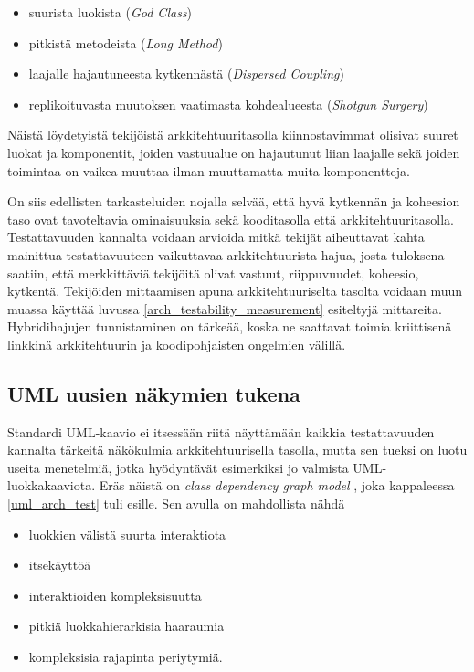 \documentclass[finnish]{tktltiki2}
\numberwithin{table}{section}
\theoremstyle{definition}
\theoremstyle{remark}
\begin{document}
\begin{itemize}
	\item suurista luokista (\textit{God Class})
	\item pitkistä metodeista (\textit{Long Method})
	\item laajalle hajautuneesta kytkennästä (\textit{Dispersed Coupling})
	\item replikoituvasta muutoksen vaatimasta kohdealueesta (\textit{Shotgun Surgery})
\end{itemize}

\noindent
Näistä löydetyistä tekijöistä arkkitehtuuritasolla kiinnostavimmat olisivat suuret luokat ja komponentit, joiden vastuualue on hajautunut liian laajalle sekä joiden toimintaa on vaikea muuttaa ilman muuttamatta muita komponentteja.

On siis edellisten tarkasteluiden nojalla selvää, että hyvä kytkennän ja koheesion taso ovat tavoteltavia ominaisuuksia sekä kooditasolla että arkkitehtuuritasolla. Testattavuuden kannalta voidaan arvioida mitkä tekijät aiheuttavat kahta mainittua testattavuuteen vaikuttavaa arkkitehtuurista hajua, josta tuloksena saatiin, että merkkittäviä tekijöitä olivat vastuut, riippuvuudet, koheesio, kytkentä. Tekijöiden mittaamisen apuna arkkitehtuuriselta tasolta voidaan muun muassa käyttää luvussa \ref{arch_testability_measurement} esiteltyjä mittareita. Hybridihajujen tunnistaminen on tärkeää, koska ne saattavat toimia kriittisenä linkkinä arkkitehtuurin ja koodipohjaisten ongelmien välillä. 


\subsection{UML uusien näkymien tukena}


Standardi UML-kaavio ei itsessään riitä näyttämään kaikkia testattavuuden kannalta tärkeitä näkökulmia arkkitehtuurisella tasolla, mutta sen tueksi on luotu useita menetelmiä, jotka hyödyntävät esimerkiksi jo valmista UML-luokkakaaviota. Eräs näistä on \textit{class dependency graph model} \citep{baudry_testability_2002}, joka kappaleessa \ref{uml_arch_test} tuli esille. Sen avulla on mahdollista nähdä 

\begin{itemize}
	\item luokkien välistä suurta interaktiota
	\item itsekäyttöä
	\item interaktioiden kompleksisuutta
	\item pitkiä luokkahierarkisia haaraumia
	\item kompleksisia rajapinta periytymiä.
\end{itemize}
\end{document}
